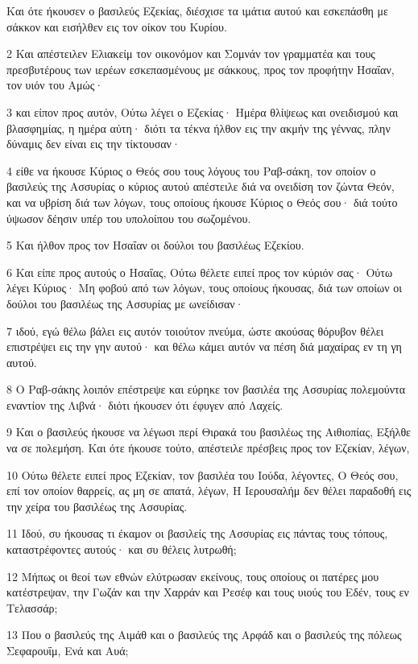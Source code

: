 \par Και ότε ήκουσεν ο βασιλεύς Εζεκίας, διέσχισε τα ιμάτια αυτού και εσκεπάσθη με σάκκον και εισήλθεν εις τον οίκον του Κυρίου.
\par 2 Και απέστειλεν Ελιακείμ τον οικονόμον και Σομνάν τον γραμματέα και τους πρεσβυτέρους των ιερέων εσκεπασμένους με σάκκους, προς τον προφήτην Ησαΐαν, τον υιόν του Αμώς·
\par 3 και είπον προς αυτόν, Ούτω λέγει ο Εζεκίας· Ημέρα θλίψεως και ονειδισμού και βλασφημίας, η ημέρα αύτη· διότι τα τέκνα ήλθον εις την ακμήν της γέννας, πλην δύναμις δεν είναι εις την τίκτουσαν·
\par 4 είθε να ήκουσε Κύριος ο Θεός σου τους λόγους του Ραβ-σάκη, τον οποίον ο βασιλεύς της Ασσυρίας ο κύριος αυτού απέστειλε διά να ονειδίση τον ζώντα Θεόν, και να υβρίση διά των λόγων, τους οποίους ήκουσε Κύριος ο Θεός σου· διά τούτο ύψωσον δέησιν υπέρ του υπολοίπου του σωζομένου.
\par 5 Και ήλθον προς τον Ησαΐαν οι δούλοι του βασιλέως Εζεκίου.
\par 6 Και είπε προς αυτούς ο Ησαΐας, Ούτω θέλετε ειπεί προς τον κύριόν σας· Ούτω λέγει Κύριος· Μη φοβού από των λόγων, τους οποίους ήκουσας, διά των οποίων οι δούλοι του βασιλέως της Ασσυρίας με ωνείδισαν·
\par 7 ιδού, εγώ θέλω βάλει εις αυτόν τοιούτον πνεύμα, ώστε ακούσας θόρυβον θέλει επιστρέψει εις την γην αυτού· και θέλω κάμει αυτόν να πέση διά μαχαίρας εν τη γη αυτού.
\par 8 Ο Ραβ-σάκης λοιπόν επέστρεψε και εύρηκε τον βασιλέα της Ασσυρίας πολεμούντα εναντίον της Λιβνά· διότι ήκουσεν ότι έφυγεν από Λαχείς.
\par 9 Και ο βασιλεύς ήκουσε να λέγωσι περί Θιρακά του βασιλέως της Αιθιοπίας, Εξήλθε να σε πολεμήση. Και ότε ήκουσε τούτο, απέστειλε πρέσβεις προς τον Εζεκίαν, λέγων,
\par 10 Ούτω θέλετε ειπεί προς Εζεκίαν, τον βασιλέα του Ιούδα, λέγοντες, Ο Θεός σου, επί τον οποίον θαρρείς, ας μη σε απατά, λέγων, Η Ιερουσαλήμ δεν θέλει παραδοθή εις την χείρα του βασιλέως της Ασσυρίας.
\par 11 Ιδού, συ ήκουσας τι έκαμον οι βασιλείς της Ασσυρίας εις πάντας τους τόπους, καταστρέφοντες αυτούς· και συ θέλεις λυτρωθή;
\par 12 Μήπως οι θεοί των εθνών ελύτρωσαν εκείνους, τους οποίους οι πατέρες μου κατέστρεψαν, την Γωζάν και την Χαρράν και Ρεσέφ και τους υιούς του Εδέν, τους εν Τελασσάρ;
\par 13 Που ο βασιλεύς της Αιμάθ και ο βασιλεύς της Αρφάδ και ο βασιλεύς της πόλεως Σεφαρουΐμ, Ενά και Αυά;
